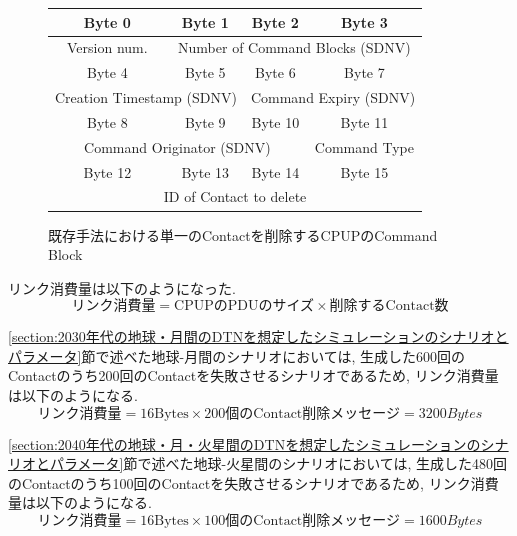 \begin{figure}[htbp]
    \centering
    \label{figure:delete_command_block_format}
    \begin{tabular}{|c|c|c|c|}
        \hline
        Byte 0 & Byte 1 & Byte 2 & Byte 3 \\
        \hline
        \multicolumn{1}{|c|}{Version num.} & \multicolumn{3}{c|}{Number of Command Blocks (SDNV)} \\
        \hline
        Byte 4 & Byte 5 & Byte 6 & Byte 7  \\
        \hline
        \multicolumn{2}{|c|}{Creation Timestamp (SDNV)} & \multicolumn{2}{c|}{Command Expiry (SDNV)} \\
        \hline
        Byte 8 & Byte 9 & Byte 10 & Byte 11 \\
        \hline
        \multicolumn{3}{|c|}{Command Originator (SDNV)} & Command Type \\
        \hline
        Byte 12 & Byte 13 & Byte 14 & Byte 15 \\
        \hline
        \multicolumn{4}{|c|}{ID of Contact to delete} \\
        \hline
    \end{tabular}
    \caption{既存手法における単一のContactを削除するCPUPのCommand Block}
  \end{figure}

リンク消費量は以下のようになった. 
\begin{equation}
    \text{リンク消費量} = \text{CPUPのPDUのサイズ} \times \text{削除するContact数}
\end{equation}

\ref{section:2030年代の地球・月間のDTNを想定したシミュレーションのシナリオとパラメータ}節で述べた地球-月間のシナリオにおいては, 
生成した600回のContactのうち200回のContactを失敗させるシナリオであるため, リンク消費量は以下のようになる. 
\begin{equation}
    \text{リンク消費量} = 16 \text{Bytes} \times 200 \text{個のContact削除メッセージ} = 3200 {Bytes} 
\end{equation}

\ref{section:2040年代の地球・月・火星間のDTNを想定したシミュレーションのシナリオとパラメータ}節で述べた地球-火星間のシナリオにおいては, 
生成した480回のContactのうち100回のContactを失敗させるシナリオであるため, リンク消費量は以下のようになる. 
\begin{equation}
    \text{リンク消費量} = 16 \text{Bytes} \times 100 \text{個のContact削除メッセージ} = 1600 {Bytes} 
\end{equation}
